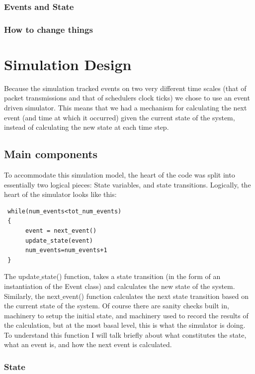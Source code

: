 \documentclass{IEEEtran}%
\begin{document}
\subsubsection{Events and State}
\subsubsection{How to change things}


\label{bib}
{}
 
 
  \appendices 
 \section{Simulation Design} \label{code_design}
 
 Because the simulation tracked events on two very different time scales (that of packet transmissions and that of schedulers clock ticks) we chose to use an event driven simulator.  This means that we had a mechanism for calculating the next event (and time at which it occurred) given the current state of the system, instead of calculating the new state at each time step.
 
 \subsection{Main components}
 To accommodate this simulation model, the heart of the code was split into essentially two logical pieces: State variables, and state transitions.  Logically, the heart of the simulator looks like this:
 \begin{verbatim}
 while(num_events<tot_num_events)
 {
      event = next_event()
      update_state(event)
      num_events=num_events+1
 }
 \end{verbatim}
 The update$\_$state() function, takes a state transition (in the form of an instantiation of the Event class) and calculates the new state of the system.  Similarly, the next$\_$event() function calculates the next state transition based on the current state of the system.  Of course there are sanity checks built in, machinery to setup the initial state, and machinery used to record the results of the calculation, but at the most basal level, this is what the simulator is doing.  To understand this function I will talk briefly about what constitutes the state, what an event is, and how the next event is calculated.
 
 \subsubsection{State}
 
\end{document}

